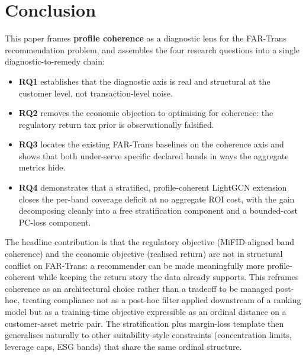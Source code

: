 \section{Conclusion}
\label{sec:conclusion}

This paper frames \textbf{profile coherence} as a diagnostic lens for the FAR-Trans recommendation problem, and assembles the four research questions into a single diagnostic-to-remedy chain:
\begin{itemize}
    \item \textbf{RQ1} establishes that the diagnostic axis is real and structural at the customer level, not transaction-level noise.
    \item \textbf{RQ2} removes the economic objection to optimising for coherence: the regulatory return tax prior is observationally falsified.
    \item \textbf{RQ3} locates the existing FAR-Trans baselines on the coherence axis and shows that both under-serve specific declared bands in ways the aggregate metrics hide.
    \item \textbf{RQ4} demonstrates that a stratified, profile-coherent LightGCN extension closes the per-band coverage deficit at no aggregate ROI cost, with the gain decomposing cleanly into a free stratification component and a bounded-cost PC-loss component.
\end{itemize}

The headline contribution is that the regulatory objective (MiFID-aligned band coherence) and the economic objective (realised return) are not in structural conflict on FAR-Trans: a recommender can be made meaningfully more profile-coherent while keeping the return story the data already supports. This reframes coherence as an architectural choice rather than a tradeoff to be managed post-hoc, treating compliance not as a post-hoc filter applied downstream of a ranking model but as a training-time objective expressible as an ordinal distance on a customer-asset metric pair. The stratification plus margin-loss template then generalises naturally to other suitability-style constraints (concentration limits, leverage caps, ESG bands) that share the same ordinal structure.

